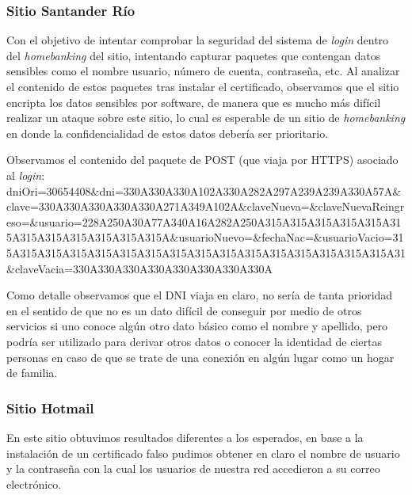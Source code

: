 \documentclass[10pt,a4paper]{article}
\begin{document}

\subsubsection{Sitio Santander Río}

Con el objetivo de intentar comprobar la seguridad del sistema de \textit{login} dentro del \textit{homebanking} del sitio, intentando capturar paquetes que contengan datos sensibles como el nombre usuario, número de cuenta, contraseña, etc. Al analizar el contenido de estos paquetes tras instalar el certificado, observamos que el sitio encripta los datos sensibles por software, de manera que es mucho más difícil realizar un ataque sobre este sitio, lo cual es esperable de un sitio de \textit{homebanking} en donde la confidencialidad de estos datos debería ser prioritario.

Observamos el contenido del paquete de POST (que viaja por HTTPS) asociado al \textit{login}:
\newline
\newline
dniOri=30654408\&dni=330A330A330A102A330A282A297A239A239A330A57A\newline\&clave=330A330A330A330A330A271A349A102A\newline\&claveNueva=\newline\&claveNuevaReingreso=\newline\&usuario=228A250A30A77A340A16A282A250A315A315A315A315A315A315A315A315A315A315A315A315A\newline\&usuarioNuevo=\newline\&fechaNac=\newline\&usuarioVacio=315A315A315A315A315A315A315A315A315A315A315A315A315A315A315A315A31\newline\&claveVacia=330A330A330A330A330A330A330A330A
\newline

Como detalle observamos que el DNI viaja en claro, no sería de tanta prioridad en el sentido de que no es un dato difícil de conseguir por medio de otros servicios si uno conoce algún otro dato básico como el nombre y apellido, pero podría ser utilizado para derivar otros datos o conocer la identidad de ciertas personas en caso de que se trate de una conexión en algún lugar como un hogar de familia.

\subsubsection{Sitio Hotmail}
En este sitio obtuvimos resultados diferentes a los esperados, en base a la instalación de un certificado falso pudimos obtener en claro el nombre de usuario y la contraseña con la cual los usuarios de nuestra red accedieron a su correo electrónico.
\end{document}
